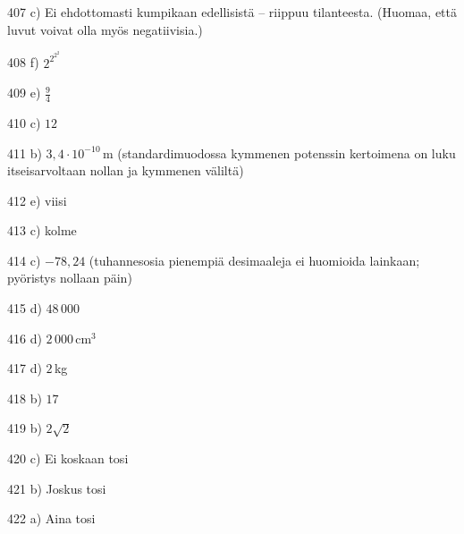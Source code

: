\begin{Vastaus}{407}
	 c) Ei ehdottomasti kumpikaan edellisistä -- riippuu tilanteesta. (Huomaa, että luvut voivat olla myös negatiivisia.)
    
\end{Vastaus}
\begin{Vastaus}{408}
	 f) $2^{2^{2^2}}$
	
\end{Vastaus}
\begin{Vastaus}{409}
e) $\frac{9}{4}$
\end{Vastaus}
\begin{Vastaus}{410}
c) $12$
\end{Vastaus}
\begin{Vastaus}{411}
b) $3,4 \cdot 10^{-10}$\,m (standardimuodossa kymmenen potenssin kertoimena on luku itseisarvoltaan nollan ja kymmenen väliltä)
\end{Vastaus}
\begin{Vastaus}{412}
e) viisi
\end{Vastaus}
\begin{Vastaus}{413}
c) kolme
\end{Vastaus}
\begin{Vastaus}{414}
c) $-78,24$ (tuhannesosia pienempiä desimaaleja ei huomioida lainkaan; pyöristys nollaan päin)
\end{Vastaus}
\begin{Vastaus}{415}
d) $48\,000$
\end{Vastaus}
\begin{Vastaus}{416}
	d) $2\,000$\,cm$^3$
	
\end{Vastaus}
\begin{Vastaus}{417}
	d) $2$\,kg
	
\end{Vastaus}
\begin{Vastaus}{418}
	b) $17$
	
\end{Vastaus}
\begin{Vastaus}{419}
	 b) $2\sqrt{2}$
    
\end{Vastaus}
\begin{Vastaus}{420}
c) Ei koskaan tosi
\end{Vastaus}
\begin{Vastaus}{421}
b) Joskus tosi
\end{Vastaus}
\begin{Vastaus}{422}
a) Aina tosi
\end{Vastaus}

